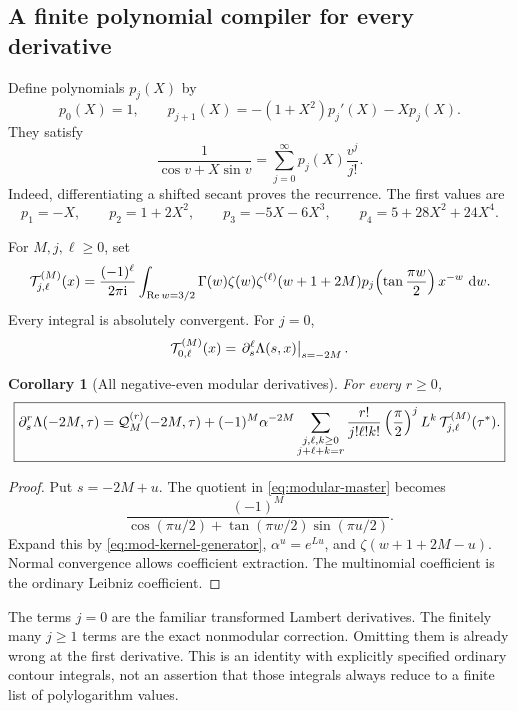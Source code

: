 \documentclass[11pt,letterpaper]{article}
\numberwithin{equation}{section}
\newtheorem{corollary}[theorem]{Corollary}
\theoremstyle{definition}
\theoremstyle{remark}
\DeclareMathOperator{\Ree}{Re}
\newcommand{\ii}{\mathrm i}
\newcommand{\dd}{\,\mathrm d}
\begin{document}
\subsection{A finite polynomial compiler for every derivative}

Define polynomials \(p_j(X)\) by
\begin{equation}\label{eq:mod-kernel-recurrence}
 p_0(X)=1,\qquad
 p_{j+1}(X)=-(1+X^2)p_j'(X)-Xp_j(X).
\end{equation}
They satisfy
\begin{equation}\label{eq:mod-kernel-generator}
 \frac1{\cos v+X\sin v}
      =\sum_{j=0}^{\infty}p_j(X)\frac{v^j}{j!}.
\end{equation}
Indeed, differentiating a shifted secant proves the recurrence.
The first values are
\[
 p_1=-X,\qquad p_2=1+2X^2,\qquad
 p_3=-5X-6X^3,\qquad p_4=5+28X^2+24X^4.
\]

For \(M,j,\ell\geq0\), set
\begin{equation}\label{eq:Tmod}
 {\cal T}_{j,\ell}^{(M)}(x)=
 \frac{(-1)^\ell}{2\pi\ii}
 \int_{\Ree w=3/2}
  \Gamma(w)\zeta(w)\zeta^{(\ell)}(w+1+2M)
  p_j\!\left(\tan\frac{\pi w}{2}\right)x^{-w}\,\dd w.
\end{equation}
Every integral is absolutely convergent. For \(j=0\),
\[
 {\cal T}_{0,\ell}^{(M)}(x)
       =\left.\partial_s^\ell\Lambda(s,x)\right|_{s=-2M}.
\]

\begin{corollary}[All negative-even modular derivatives]\label{cor:mod-jets}
For every \(r\geq0\),
\begin{equation}\label{eq:mod-jets}
 \boxed{\displaystyle
 \partial_s^r\Lambda(-2M,\tau)
 ={\cal Q}_M^{(r)}(-2M,\tau)
  +(-1)^M\alpha^{-2M}
  \sum_{\substack{j,\ell,k\geq0\\j+\ell+k=r}}
       \frac{r!}{j!\ell!k!}
       \left(\frac{\pi}{2}\right)^j
       L^k\,{\cal T}_{j,\ell}^{(M)}(\tau^*).}
\end{equation}
\end{corollary}

\begin{proof}
Put \(s=-2M+u\). The quotient in
\eqref{eq:modular-master} becomes
\[
 \frac{(-1)^M}
 {\cos(\pi u/2)+\tan(\pi w/2)\sin(\pi u/2)}.
\]
Expand this by \eqref{eq:mod-kernel-generator},
\(\alpha^u=e^{Lu}\), and
\(\zeta(w+1+2M-u)\). Normal convergence allows coefficient
extraction. The multinomial coefficient is the ordinary
Leibniz coefficient.
\end{proof}

The terms \(j=0\) are the familiar transformed Lambert
derivatives. The finitely many \(j\geq1\) terms are the exact
nonmodular correction. Omitting them is already wrong at the
first derivative. This is an identity with explicitly specified
ordinary contour integrals, not an assertion that those integrals
always reduce to a finite list of polylogarithm values.
\end{document}
